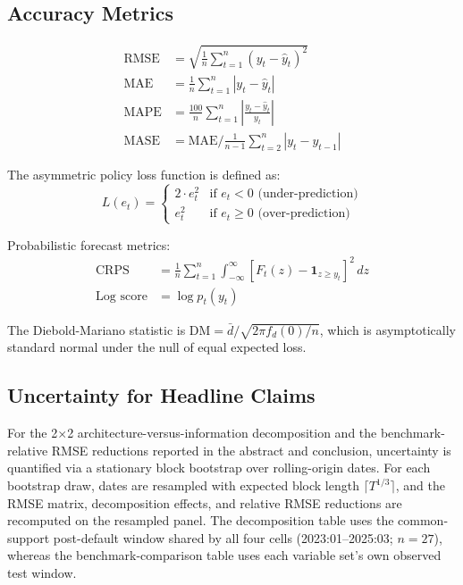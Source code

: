 \documentclass[12pt,a4paper]{article}
\begin{document}


\subsection{Accuracy Metrics}

\begin{align}
\text{RMSE} &= \sqrt{\frac{1}{n} \sum_{t=1}^{n} (y_t - \hat{y}_t)^2} \\
\text{MAE} &= \frac{1}{n} \sum_{t=1}^{n} |y_t - \hat{y}_t| \\
\text{MAPE} &= \frac{100}{n} \sum_{t=1}^{n} \left| \frac{y_t - \hat{y}_t}{y_t} \right| \\
\text{MASE} &= \text{MAE} \bigg/ \frac{1}{n-1} \sum_{t=2}^{n} |y_t - y_{t-1}|
\end{align}

The asymmetric policy loss function is defined as:
\[
L(e_t) = \begin{cases} 2 \cdot e_t^2 & \text{if } e_t < 0 \text{ (under-prediction)} \\ e_t^2 & \text{if } e_t \geq 0 \text{ (over-prediction)} \end{cases}
\]

Probabilistic forecast metrics:
\begin{align}
\text{CRPS} &= \frac{1}{n} \sum_{t=1}^{n} \int_{-\infty}^{\infty} [F_t(z) - \mathbf{1}_{z \geq y_t}]^2 \, dz \\
\text{Log score} &= \log p_t(y_t)
\end{align}

The Diebold-Mariano statistic is $\text{DM} = \bar{d} / \sqrt{2\pi f_d(0) / n}$, which is asymptotically standard normal under the null of equal expected loss.

\subsection{Uncertainty for Headline Claims}

For the 2$\times$2 architecture-versus-information decomposition and the benchmark-relative RMSE reductions reported in the abstract and conclusion, uncertainty is quantified via a stationary block bootstrap over rolling-origin dates. For each bootstrap draw, dates are resampled with expected block length $\lceil T^{1/3} \rceil$, and the RMSE matrix, decomposition effects, and relative RMSE reductions are recomputed on the resampled panel. The decomposition table uses the common-support post-default window shared by all four cells (2023:01--2025:03; $n = 27$), whereas the benchmark-comparison table uses each variable set's own observed test window.
\end{document}
